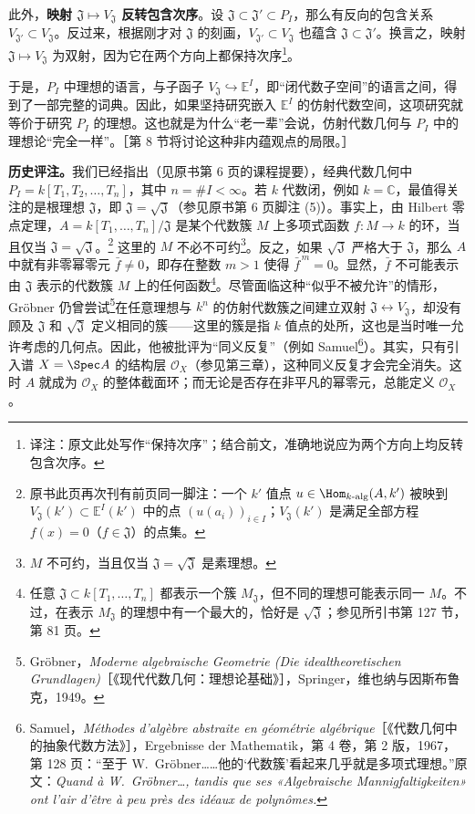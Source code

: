 此外，\textbf{映射 $\mathfrak J\mapsto V_{\mathfrak J}$ 反转包含次序}。设 $\mathfrak J\subset\mathfrak J'\subset P_I$，那么有反向的包含关系 $V_{\mathfrak J'}\subset V_{\mathfrak J}$。反过来，根据刚才对 $\mathfrak J$ 的刻画，$V_{\mathfrak J'}\subset V_{\mathfrak J}$ 也蕴含 $\mathfrak J\subset\mathfrak J'$。换言之，映射 $\mathfrak J\mapsto V_{\mathfrak J}$ 为双射，因为它在两个方向上都保持次序\footnote{译注：原文此处写作“保持次序”；结合前文，准确地说应为两个方向上均反转包含次序。}。

于是，$P_I$ 中理想的语言，与子函子 $V_{\mathfrak J}\hookrightarrow\mathbb E^I$，即“闭代数子空间”的语言之间，得到了一部完整的词典。因此，如果坚持研究嵌入 $\mathbb E^I$ 的仿射代数空间，这项研究就等价于研究 $P_I$ 的理想。这也就是为什么“老一辈”会说，仿射代数几何与 $P_I$ 中的理想论“完全一样”。［第 8 节将讨论这种非内蕴观点的局限。］

\textbf{历史评注。}我们已经指出（见原书第 6 页的课程提要），经典代数几何中 $P_I=k[T_1,T_2,\ldots,T_n]$，其中 $n=\#I<\infty$。若 $k$ 代数闭，例如 $k=\mathbb C$，最值得关注的是根理想 $\mathfrak J$，即 $\mathfrak J=\sqrt{\mathfrak J}$（参见原书第 6 页脚注 (5)）。事实上，由 Hilbert 零点定理，$A=k[T_1,\ldots,T_n]/\mathfrak J$ 是某个代数簇 $M$ 上多项式函数 $f\colon M\to k$ 的环，当且仅当 $\mathfrak J=\sqrt{\mathfrak J}$。\footnote{原书此页再次刊有前页同一脚注：一个 $k'$ 值点 $u\in\Hom_{k\text{-alg}}(A,k')$ 被映到 $V_{\mathfrak J}(k')\subset\mathbb E^I(k')$ 中的点 $(u(a_i))_{i\in I}$；$V_{\mathfrak J}(k')$ 是满足全部方程 $f(x)=0$（$f\in\mathfrak J$）的点集。}
这里的 $M$ 不必不可约\footnote{$M$ 不可约，当且仅当 $\mathfrak J=\sqrt{\mathfrak J}$ 是素理想。}。反之，如果 $\sqrt{\mathfrak J}$ 严格大于 $\mathfrak J$，那么 $A$ 中就有非零幂零元 $\bar f\ne0$，即存在整数 $m>1$ 使得 $\bar f^{\,m}=0$。显然，$\bar f$ 不可能表示由 $\mathfrak J$ 表示的代数簇 $M$ 上的任何函数\footnote{任意 $\mathfrak J\subset k[T_1,\ldots,T_n]$ 都表示一个簇 $M_{\mathfrak J}$，但不同的理想可能表示同一 $M$。不过，在表示 $M_{\mathfrak J}$ 的理想中有一个最大的，恰好是 $\sqrt{\mathfrak J}$；参见所引书第 127 节，第 81 页。}。尽管面临这种“似乎不被允许”的情形，Gröbner 仍曾尝试\footnote{Gröbner，\textit{Moderne algebraische Geometrie (Die idealtheoretischen Grundlagen)}［《现代代数几何：理想论基础》］，Springer，维也纳与因斯布鲁克，1949。}在任意理想与 $k^n$ 的仿射代数簇之间建立双射 $\mathfrak J\leftrightarrow V_{\mathfrak J}$，却没有顾及 $\mathfrak J$ 和 $\sqrt{\mathfrak J}$ 定义相同的簇——这里的簇是指 $k$ 值点的处所，这也是当时唯一允许考虑的几何点。因此，他被批评为“同义反复”（例如 Samuel\footnote{Samuel，\textit{Méthodes d'algèbre abstraite en géométrie algébrique}［《代数几何中的抽象代数方法》］，Ergebnisse der Mathematik，第 4 卷，第 2 版，1967，第 128 页：“至于 W.~Gröbner……他的‘代数簇’看起来几乎就是多项式理想。”原文：\textit{Quand à W.~Gröbner\ldots, tandis que ses «Algebraische Mannigfaltigkeiten» ont l'air d'être à peu près des idéaux de polynômes.}}）。其实，只有引入谱 $X=\Spec A$ 的结构层 $\mathcal O_X$（参见第三章），这种同义反复才会完全消失。这时 $A$ 就成为 $\mathcal O_X$ 的整体截面环；而无论是否存在非平凡的幂零元，总能定义 $\mathcal O_X$。

